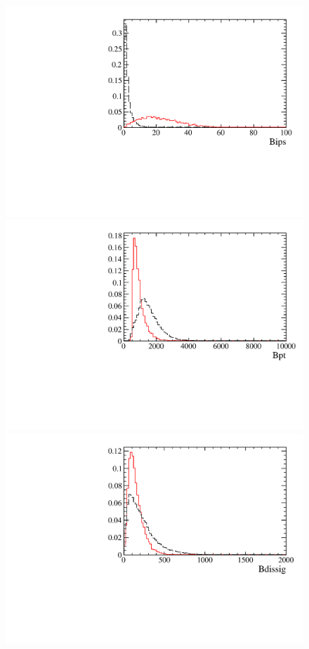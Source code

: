 \documentclass[12pt,a4paper]{article}
\begin{document}
\begin{figure} [htb!]
\begin{center}
\includegraphics[scale=0.20]{figs/BipsPARTIALptcut.pdf}
\includegraphics[scale=0.20]{figs/BptPARTIALptcut.pdf}
\includegraphics[scale=0.20]{figs/BdissigPARTIALptcut.pdf}

\end{center}
\end{figure}
\end{document}

